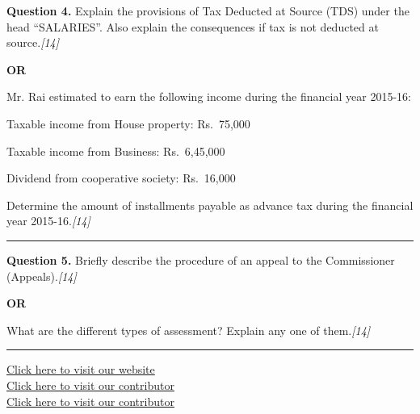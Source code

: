 \documentclass[11pt,a4paper]{article}
\newcommand{\pts}[1]{\hfill   \textit{[#1]}}
\begin{document}
\noindent   \textbf{Question 4.}
Explain the provisions of Tax Deducted at Source (TDS) under the head ``SALARIES''. Also explain the consequences if tax is not deducted at source.\pts{14}

\centerline{   \textbf{OR}}

Mr. Rai estimated to earn the following income during the financial year 2015-16:

\begin{parts}
  \item Taxable income from House property: Rs.\ 75,000
  \item Taxable income from Business: Rs.\ 6,45,000
  \item Dividend from cooperative society: Rs.\ 16,000
\end{parts}
Determine the amount of installments payable as advance tax during the financial year 2015-16.\pts{14}

\medskip\rule{\linewidth}{0.2pt}




\noindent   \textbf{Question 5.}
Briefly describe the procedure of an appeal to the Commissioner (Appeals).\pts{14}

\centerline{   \textbf{OR}}

What are the different types of assessment? Explain any one of them.\pts{14}

\vfill
\rule{\linewidth}{0.4pt}

\begin{center}\small
\href{https://bhu-exam.vercel.app/}{Click here to visit our website}\\[4pt]
\href{https://me-aryan.vercel.app/}{Click here to visit our contributor}\\[4pt]
\href{https://quashan-me.vercel.app/}{Click here to visit our contributor}
\end{center}
\end{document}
